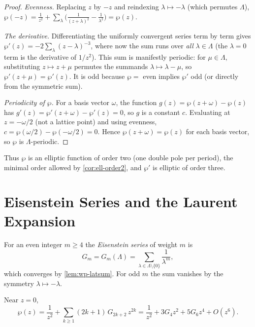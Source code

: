 \begin{proof}
\emph{Evenness.} Replacing \(z\) by \(-z\) and reindexing \(\lambda \mapsto
-\lambda\) (which permutes \(\Lambda\)),
\(\wp(-z) = \tfrac1{z^2} + \sum_\lambda\bigl(\tfrac1{(z+\lambda)^2} -
\tfrac1{\lambda^2}\bigr) = \wp(z)\).

\emph{The derivative.} Differentiating the uniformly convergent series term by
term gives \(\wp'(z) = -2\sum_{\lambda}(z-\lambda)^{-3}\), where now the sum runs
over \emph{all} \(\lambda \in \Lambda\) (the \(\lambda = 0\) term is the
derivative of \(1/z^2\)). This sum is manifestly periodic: for \(\mu \in \Lambda\),
substituting \(z \mapsto z+\mu\) permutes the summands \(\lambda \mapsto
\lambda - \mu\), so \(\wp'(z+\mu) = \wp'(z)\). It is odd because
\(\wp = \) even implies \(\wp'\) odd (or directly from the symmetric sum).

\emph{Periodicity of \(\wp\).} For a basis vector \(\omega\), the function
\(g(z) = \wp(z+\omega) - \wp(z)\) has \(g'(z) = \wp'(z+\omega) - \wp'(z) = 0\), so
\(g\) is a constant \(c\). Evaluating at \(z = -\omega/2\) (not a lattice point)
and using evenness, \(c = \wp(\omega/2) - \wp(-\omega/2) = 0\). Hence
\(\wp(z+\omega) = \wp(z)\) for each basis vector, so \(\wp\) is
\(\Lambda\)-periodic.
\end{proof}

Thus \(\wp\) is an elliptic function of order two (one double pole per period),
the minimal order allowed by \cref{cor:ell-order2}, and \(\wp'\) is elliptic of
order three.

\section{Eisenstein Series and the Laurent Expansion}
\label{sec:wp-eisenstein}

\begin{definition}
\label{def:wp-eisenstein}
For an even integer \(m \ge 4\) the \emph{Eisenstein series} of weight \(m\) is
\[
  G_m = G_m(\Lambda) = \sum_{\lambda \in \Lambda \setminus \{0\}} \frac{1}{\lambda^{m}},
\]
which converges by \cref{lem:wp-latsum}. For odd \(m\) the sum vanishes by the
symmetry \(\lambda \mapsto -\lambda\).
\end{definition}

\begin{proposition}
\label{prop:wp-laurent}
Near \(z = 0\),
\[
  \wp(z) = \frac{1}{z^2} + \sum_{k \ge 1} (2k+1)\,G_{2k+2}\, z^{2k}
  = \frac{1}{z^2} + 3 G_4 z^2 + 5 G_6 z^4 + O(z^6).
\]
\end{proposition}

